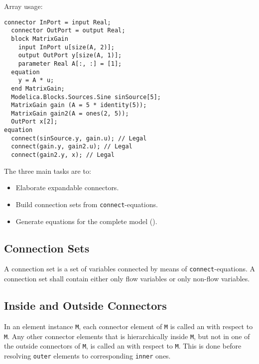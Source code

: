 \begin{example}
Array usage:
\begin{lstlisting}[language=modelica]
  connector InPort = input Real;
  connector OutPort = output Real;
  block MatrixGain
    input InPort u[size(A, 2)];
    output OutPort y[size(A, 1)];
    parameter Real A[:, :] = [1];
  equation
    y = A * u;
  end MatrixGain;
  Modelica.Blocks.Sources.Sine sinSource[5];
  MatrixGain gain (A = 5 * identity(5));
  MatrixGain gain2(A = ones(2, 5));
  OutPort x[2];
equation
  connect(sinSource.y, gain.u); // Legal
  connect(gain.y, gain2.u); // Legal
  connect(gain2.y, x); // Legal
\end{lstlisting}
\end{example}

The three main tasks are to:
\begin{itemize}
\item
  Elaborate expandable connectors.
\item
  Build connection sets from \lstinline!connect!-equations.
\item
  Generate equations for the complete model ().
\end{itemize}

\subsection{Connection Sets}\label{connection-sets}

A connection set is a set of variables connected by means of \lstinline!connect!-equations.
A connection set shall contain either only flow variables or only non-flow variables.

\subsection{Inside and Outside Connectors}\label{inside-and-outside-connectors}

In an element instance \lstinline!M!, each connector element of \lstinline!M! is called an  with respect to \lstinline!M!.
Any other connector elements that is hierarchically inside \lstinline!M!, but not in one of the outside connectors of \lstinline!M!, is called an  with respect to \lstinline!M!.
This is done before resolving \lstinline!outer! elements to corresponding \lstinline!inner! ones.

